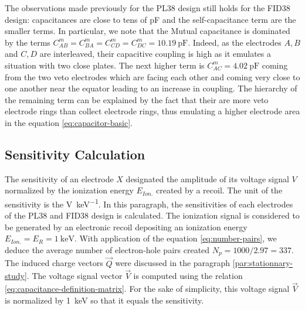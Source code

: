 The observations made previously for the PL38 design still holds for the FID38 design: capacitances are close to tens of \si{\pico\farad} and the self-capacitance term are the smaller terms. In particular, we note that the Mutual capacitance is dominated by the terms $C_{AB}^m=C_{BA}^m=C_{CD}^m=C_{DC}^m=\SI{10.19}{\pico\farad}$. Indeed, as the electrodes $A,B$ and $C,D$ are interleaved, their capacitive coupling is high as it emulates a situation with two close plates. The next higher term is $C_{AC}^m=\SI{4.02}{\pico\farad}$ coming from the two veto electrodes which are facing each other and coming very close to one another near the equator leading to an increase in coupling. The hierarchy of the remaining term can be explained by the fact that their are more veto electrode rings than collect electrode rings, thus emulating a higher electrode area in the equation \ref{eq:capacitor-basic}.


\subsection{Sensitivity Calculation}
\label{par:sensitivity-calculation}


The sensitivity of an electrode $X$ designated the amplitude of its voltage signal $V$ normalized by the ionization energy $E_{Ion.}$ created by a recoil. The unit of the sensitivity is the \si{\volt \per \kilo\eV}. In this paragraph, the sensitivities of each electrodes of the PL38 and FID38 design is calculated. The ionization signal is considered to be generated by an electronic recoil depositing an ionization energy $E_{Ion.} = E_R = \SI{1}{\kilo\eV}$. With application of the equation \ref{eq:number-pairs}, we deduce the average number of electron-hole pairs created $N_p = 1000/2.97 = 337$. The induced charge vectors $\vec{Q}$ were discussed in the paragraph \ref{par:stationnary-study}. The voltage signal vector $\vec{V}$ is computed using the relation \ref{eq:capacitance-definition-matrix}. For the sake of simplicity, this voltage signal $\vec{V}$ is normalized by \SI{1}{\kilo\eV} so that it equals the sensitivity.

